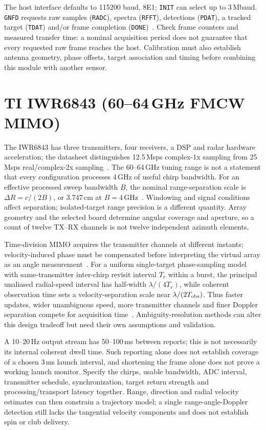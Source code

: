 The host interface defaults to 115200 baud, 8E1; \texttt{INIT} can select up to 3\,Mbaud.
\texttt{GNFD} requests raw samples (\texttt{RADC}), spectra (\texttt{RFFT}), detections (\texttt{PDAT}), a tracked target (\texttt{TDAT}) and/or frame completion (\texttt{DONE})~\cite{kld7}.
Check frame counters and measured transfer time: a nominal acquisition period does not guarantee that every requested raw frame reaches the host.
Calibration must also establish antenna geometry, phase offsets, target association and timing before combining this module with another sensor.

\section{TI IWR6843 (60--64\,GHz FMCW MIMO)}

The IWR6843 has three transmitters, four receivers, a DSP and radar hardware acceleration; the datasheet distinguishes 12.5\,Msps complex-1x sampling from 25\,Msps real/complex-2x sampling~\cite{iwr6843}.
The 60--64\,GHz tuning range is not a statement that every configuration processes 4\,GHz of useful chirp bandwidth.
For an effective processed sweep bandwidth $B$, the nominal range-separation scale is $\Delta R=c/(2B)$, or 3.747\,cm at $B=4$\,GHz~\cite{tichirp}.
Windowing and signal conditions affect separation; isolated-target range precision is a different quantity.
Array geometry and the selected board determine angular coverage and aperture, so a count of twelve TX--RX channels is not twelve independent azimuth elements.

Time-division MIMO acquires the transmitter channels at different instants; velocity-induced phase must be compensated before interpreting the virtual array as an angle measurement~\cite{timimo}.
For a uniform single-target phase-sampling model with same-transmitter inter-chirp revisit interval $T_r$ within a burst, the principal unaliased radial-speed interval has half-width $\lambda/(4T_r)$, while coherent observation time sets a velocity-separation scale near $\lambda/(2T_{\rm obs})$.
Thus faster updates, wider unambiguous speed, more transmitter channels and finer Doppler separation compete for acquisition time~\cite{tichirp,timimo}.
Ambiguity-resolution methods can alter this design tradeoff but need their own assumptions and validation.

A 10--20\,Hz output stream has 50--100\,ms between reports; this is not necessarily its internal coherent dwell time.
Such reporting alone does not establish coverage of a chosen 3\,ms launch interval, and shortening the frame alone does not prove a working launch monitor.
Specify the chirps, usable bandwidth, ADC interval, transmitter schedule, synchronization, target return strength and processing/transport latency together.
Range, direction and radial velocity estimates can then constrain a trajectory model; a single range-angle-Doppler detection still lacks the tangential velocity components and does not establish spin or club delivery.

